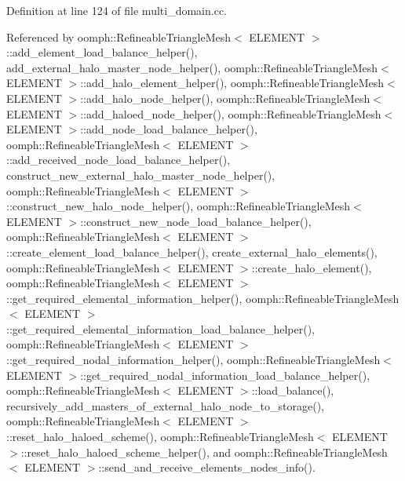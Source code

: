 Definition at line 124 of file multi\+\_\+domain.\+cc.



Referenced by oomph\+::\+Refineable\+Triangle\+Mesh$<$ E\+L\+E\+M\+E\+N\+T $>$\+::add\+\_\+element\+\_\+load\+\_\+balance\+\_\+helper(), add\+\_\+external\+\_\+halo\+\_\+master\+\_\+node\+\_\+helper(), oomph\+::\+Refineable\+Triangle\+Mesh$<$ E\+L\+E\+M\+E\+N\+T $>$\+::add\+\_\+halo\+\_\+element\+\_\+helper(), oomph\+::\+Refineable\+Triangle\+Mesh$<$ E\+L\+E\+M\+E\+N\+T $>$\+::add\+\_\+halo\+\_\+node\+\_\+helper(), oomph\+::\+Refineable\+Triangle\+Mesh$<$ E\+L\+E\+M\+E\+N\+T $>$\+::add\+\_\+haloed\+\_\+node\+\_\+helper(), oomph\+::\+Refineable\+Triangle\+Mesh$<$ E\+L\+E\+M\+E\+N\+T $>$\+::add\+\_\+node\+\_\+load\+\_\+balance\+\_\+helper(), oomph\+::\+Refineable\+Triangle\+Mesh$<$ E\+L\+E\+M\+E\+N\+T $>$\+::add\+\_\+received\+\_\+node\+\_\+load\+\_\+balance\+\_\+helper(), construct\+\_\+new\+\_\+external\+\_\+halo\+\_\+master\+\_\+node\+\_\+helper(), oomph\+::\+Refineable\+Triangle\+Mesh$<$ E\+L\+E\+M\+E\+N\+T $>$\+::construct\+\_\+new\+\_\+halo\+\_\+node\+\_\+helper(), oomph\+::\+Refineable\+Triangle\+Mesh$<$ E\+L\+E\+M\+E\+N\+T $>$\+::construct\+\_\+new\+\_\+node\+\_\+load\+\_\+balance\+\_\+helper(), oomph\+::\+Refineable\+Triangle\+Mesh$<$ E\+L\+E\+M\+E\+N\+T $>$\+::create\+\_\+element\+\_\+load\+\_\+balance\+\_\+helper(), create\+\_\+external\+\_\+halo\+\_\+elements(), oomph\+::\+Refineable\+Triangle\+Mesh$<$ E\+L\+E\+M\+E\+N\+T $>$\+::create\+\_\+halo\+\_\+element(), oomph\+::\+Refineable\+Triangle\+Mesh$<$ E\+L\+E\+M\+E\+N\+T $>$\+::get\+\_\+required\+\_\+elemental\+\_\+information\+\_\+helper(), oomph\+::\+Refineable\+Triangle\+Mesh$<$ E\+L\+E\+M\+E\+N\+T $>$\+::get\+\_\+required\+\_\+elemental\+\_\+information\+\_\+load\+\_\+balance\+\_\+helper(), oomph\+::\+Refineable\+Triangle\+Mesh$<$ E\+L\+E\+M\+E\+N\+T $>$\+::get\+\_\+required\+\_\+nodal\+\_\+information\+\_\+helper(), oomph\+::\+Refineable\+Triangle\+Mesh$<$ E\+L\+E\+M\+E\+N\+T $>$\+::get\+\_\+required\+\_\+nodal\+\_\+information\+\_\+load\+\_\+balance\+\_\+helper(), oomph\+::\+Refineable\+Triangle\+Mesh$<$ E\+L\+E\+M\+E\+N\+T $>$\+::load\+\_\+balance(), recursively\+\_\+add\+\_\+masters\+\_\+of\+\_\+external\+\_\+halo\+\_\+node\+\_\+to\+\_\+storage(), oomph\+::\+Refineable\+Triangle\+Mesh$<$ E\+L\+E\+M\+E\+N\+T $>$\+::reset\+\_\+halo\+\_\+haloed\+\_\+scheme(), oomph\+::\+Refineable\+Triangle\+Mesh$<$ E\+L\+E\+M\+E\+N\+T $>$\+::reset\+\_\+halo\+\_\+haloed\+\_\+scheme\+\_\+helper(), and oomph\+::\+Refineable\+Triangle\+Mesh$<$ E\+L\+E\+M\+E\+N\+T $>$\+::send\+\_\+and\+\_\+receive\+\_\+elements\+\_\+nodes\+\_\+info().

